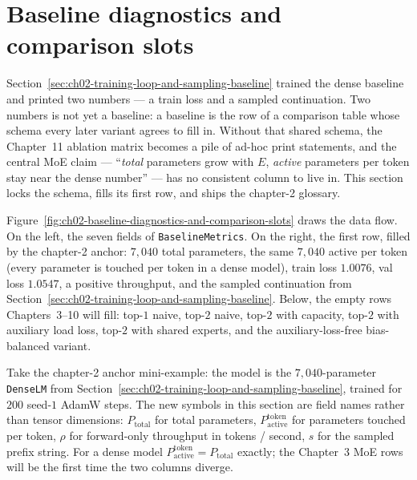 \section{Baseline diagnostics and comparison slots}
\label{sec:ch02-baseline-diagnostics-and-comparison-slots}

Section~\ref{sec:ch02-training-loop-and-sampling-baseline} trained the dense baseline and printed two numbers --- a train loss and a sampled continuation. Two numbers is not yet a baseline: a baseline is the row of a comparison table whose schema every later variant agrees to fill in. Without that shared schema, the Chapter~11 ablation matrix becomes a pile of ad-hoc print statements, and the central MoE claim --- ``\emph{total} parameters grow with $E$, \emph{active} parameters per token stay near the dense number'' --- has no consistent column to live in. This section locks the schema, fills its first row, and ships the chapter-2 glossary.



Figure~\ref{fig:ch02-baseline-diagnostics-and-comparison-slots} draws the data flow. On the left, the seven fields of \texttt{BaselineMetrics}. On the right, the first row, filled by the chapter-2 anchor: $7{,}040$ total parameters, the same $7{,}040$ active per token (every parameter is touched per token in a dense model), train loss $1.0076$, val loss $1.0547$, a positive throughput, and the sampled continuation from Section~\ref{sec:ch02-training-loop-and-sampling-baseline}. Below, the empty rows Chapters~3--10 will fill: top-$1$ naive, top-$2$ naive, top-$2$ with capacity, top-$2$ with auxiliary load loss, top-$2$ with shared experts, and the auxiliary-loss-free bias-balanced variant.

Take the chapter-2 anchor mini-example: the model is the $7{,}040$-parameter \texttt{DenseLM} from Section~\ref{sec:ch02-training-loop-and-sampling-baseline}, trained for $200$ seed-$1$ AdamW steps. The new symbols in this section are field names rather than tensor dimensions: $P_{\text{total}}$ for total parameters, $P^{\text{token}}_{\text{active}}$ for parameters touched per token, $\rho$ for forward-only throughput in tokens / second, $s$ for the sampled prefix string. For a dense model $P^{\text{token}}_{\text{active}} = P_{\text{total}}$ exactly; the Chapter~3 MoE rows will be the first time the two columns diverge.



